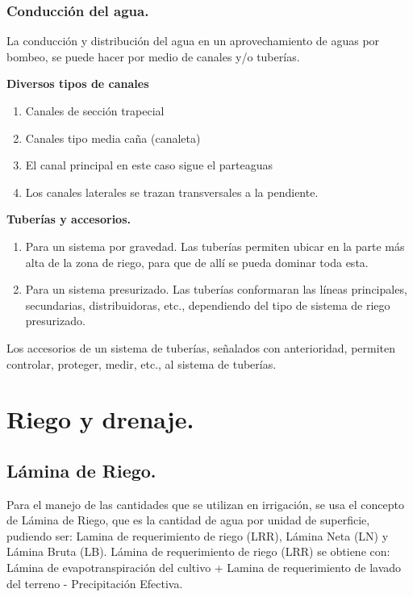 \subsubsection{Conducción del agua.}
La conducción y distribución del agua en un aprovechamiento de aguas por
bombeo, se puede hacer por medio de canales y/o tuberías.

\textbf{Diversos tipos de canales}

\begin{enumerate}
	\item Canales de sección trapecial
	\item Canales tipo media caña (canaleta)
	\item El canal principal en este caso sigue el parteaguas
	\item Los canales laterales se trazan transversales a la pendiente.
\end{enumerate}

\textbf{Tuberías y accesorios.}

\begin{enumerate}
	\item Para un sistema por gravedad. Las tuberías permiten ubicar en la parte
	      más alta de la zona de riego, para que de allí se pueda dominar toda esta.
	\item Para un sistema presurizado. Las tuberías conformaran las líneas
	      principales, secundarias, distribuidoras, etc., dependiendo del tipo de sistema de riego
	      presurizado.
\end{enumerate}

Los accesorios de un sistema de tuberías, señalados con anterioridad, permiten
controlar, proteger, medir, etc., al sistema de tuberías.

\section{Riego y drenaje.}

\subsection{Lámina de Riego.}

Para el manejo de las cantidades que se utilizan en irrigación, se usa el concepto
de Lámina de Riego, que es la cantidad de agua por unidad de superficie, pudiendo ser:
Lamina de requerimiento de riego (LRR), Lámina Neta (LN) y Lámina Bruta (LB).
Lámina de requerimiento de riego (LRR) se obtiene con: Lámina de
evapotranspiración del cultivo + Lamina de requerimiento de lavado del terreno -
Precipitación Efectiva.

